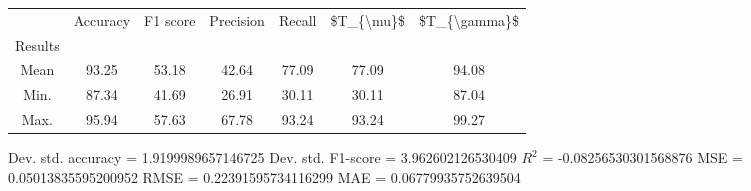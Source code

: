 \begin{tabular}{|c|c|c|c|c|c|c|}
\toprule
{} &  Accuracy &  F1 score &  Precision &  Recall &  \$T\_\{\textbackslash mu\}\$ &  \$T\_\{\textbackslash gamma\}\$ \\
Results &           &           &            &         &            &               \\
\hline
Mean    &     93.25 &     53.18 &      42.64 &   77.09 &      77.09 &         94.08 \\
Min.    &     87.34 &     41.69 &      26.91 &   30.11 &      30.11 &         87.04 \\
Max.    &     95.94 &     57.63 &      67.78 &   93.24 &      93.24 &         99.27 \\
\bottomrule
\end{tabular}

 Dev. std. accuracy = 1.9199989657146725
 Dev. std. F1-score = 3.962602126530409
 $R^2$ = -0.08256530301568876
 MSE = 0.05013835595200952
 RMSE = 0.22391595734116299
 MAE = 0.06779935752639504